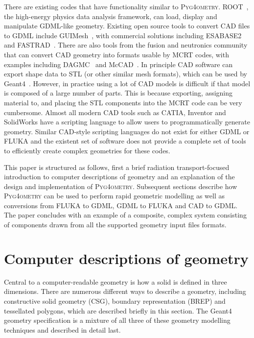 \documentclass[final,5p,times,twocolumn]{elsarticle}
\newcommand{\PYGEOMETRY}{\textsc{Pyg4ometry}}
\begin{document}
There are existing codes that have functionality similar to \PYGEOMETRY{}. ROOT~\cite{Brun:1997pa}, the high-energy physics data analysis framework,
can load, display and manipulate GDML-like geometry. Existing open source tools to convert CAD files to GDML include GUIMesh~\cite{GUIMesh_Pinto}, with commercial
solutions including ESABASE2~\cite{ESABASE2} and FASTRAD~\cite{FASTRAD}. There are also tools from the fusion and neutronics community that can convert CAD
geometry into formats usable by MCRT codes, with examples including DAGMC~\cite{DAGMC} and McCAD~\cite{McCad}. In principle CAD software can export shape data to STL
(or other similar mesh formats), which can be used by Geant4~\cite{poole2012acad}. However, in practice using a lot of CAD models is difficult if that model is composed of a
large number of parts. This is because exporting, assigning material to, and placing the STL components into the MCRT code can be very cumbersome. Almost all modern CAD tools such as
CATIA, Inventor and SolidWorks have a scripting language to allow users to programmatically generate geometry. Similar CAD-style scripting languages do not exist for either GDML
or FLUKA and the existent set of software does not provide a complete set of tools to efficiently create complex geometries for these codes.

This paper is structured as follows, first a brief radiation
transport-focused introduction to computer descriptions of geometry and an explanation of the design
and implementation of \PYGEOMETRY{}. Subsequent sections describe how \PYGEOMETRY{} can be used to perform rapid geometric modelling as well as conversions from
FLUKA to GDML, GDML to FLUKA and CAD to GDML. The paper concludes with an example of a composite, complex system consisting of components drawn from
all the supported  geometry input files formats.

\section{Computer descriptions of geometry} \label{sec:geometric}
Central to a computer-readable geometry is how a solid is defined in three dimensions. There are numerous different ways to describe a
geometry, including constructive solid geometry (CSG), boundary representation (BREP) and tessellated polygons, which are described
briefly in this section.  The Geant4 geometry specification is a mixture of all three of these geometry modelling techniques and described in detail last.
\end{document}
